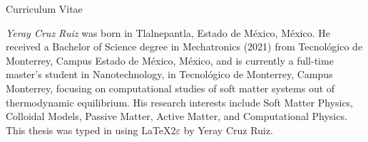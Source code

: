 \huge{Curriculum Vitae} \\
\normalsize
\vspace*{1.0 cm}


\emph{Yeray Cruz Ruiz} was born in Tlalnepantla, Estado de México, México. He received a Bachelor of Science degree in Mechatronics (2021) from Tecnológico de Monterrey, Campus Estado de México, México, and is currently a full-time master's student in Nanotechnology, in Tecnológico de Monterrey, Campus Monterrey, focusing on computational studies of soft matter systems out of thermodynamic equilibrium. His research interests include Soft Matter Physics, Colloidal Models, Passive Matter, Active Matter,  and Computational Physics. 
\vfill
This thesis was typed in using \LaTeX2$\varepsilon$ by Yeray Cruz Ruiz.
